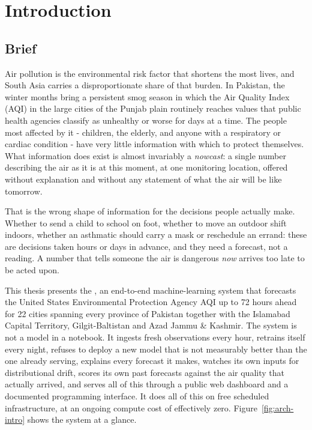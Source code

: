 \chapter{Introduction}
\label{ch:intro}

\section{Brief}
Air pollution is the environmental risk factor that shortens the most lives, and
South Asia carries a disproportionate share of that burden. In Pakistan, the
winter months bring a persistent smog season in which the Air Quality Index (AQI)
in the large cities of the Punjab plain routinely reaches values that public
health agencies classify as unhealthy or worse for days at a time. The people
most affected by it - children, the elderly, and anyone with a respiratory or
cardiac condition - have very little information with which to protect
themselves. What information does exist is almost invariably a \emph{nowcast}: a
single number describing the air as it is at this moment, at one monitoring
location, offered without explanation and without any statement of what the air
will be like tomorrow.

That is the wrong shape of information for the decisions people actually make.
Whether to send a child to school on foot, whether to move an outdoor shift
indoors, whether an asthmatic should carry a mask or reschedule an errand: these
are decisions taken hours or days in advance, and they need a forecast, not a
reading. A number that tells someone the air is dangerous \emph{now} arrives too
late to be acted upon.

This thesis presents the \projname, an end-to-end machine-learning system that
forecasts the United States Environmental Protection Agency AQI up to 72 hours
ahead for 22 cities spanning every province of Pakistan together with the
Islamabad Capital Territory, Gilgit-Baltistan and Azad Jammu \& Kashmir. The
system is not a model in a notebook. It ingests fresh observations every hour,
retrains itself every night, refuses to deploy a new model that is not measurably
better than the one already serving, explains every forecast it makes, watches
its own inputs for distributional drift, scores its own past forecasts against
the air quality that actually arrived, and serves all of this through a public
web dashboard and a documented programming interface. It does all of this on free
scheduled infrastructure, at an ongoing compute cost of effectively zero.
Figure~\ref{fig:arch-intro} shows the system at a glance.

